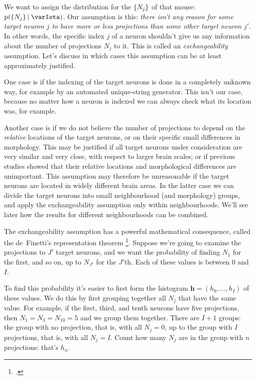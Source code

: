 \documentclass[\ifafour a4paper,12pt,\else a5paper,10pt,\fi%
onecolumn,oneside,article,%
british%
]{memoir}
\theoremstyle{remark}
\theoremstyle{innote}
\newcommand*{\citep}{\footcites}
\newcommand*{\pf}{\mathrm{p}}%
\renewcommand*{\|}[1][]{\nonscript\,#1\vert\nonscript\;\mathopen{}}
\newcommand*{\puzzle}{{\fontencoding{U}\fontfamily{fontawesometwo}\selectfont\symbol{225}}}
\newcommand{\mynote}[1]{ {\color{notecolour}\puzzle\ #1}}
\newcommand*{\yI}{\varIota}
\newcommand*{\yh}{\bm{h}}
\DeclarePairedDelimiter\tu{\{}{\}}
\begin{document}
We want to assign the distribution for the $\tu{N_{j}}$ of that mouse:
$\pf(\tu{N_{j}} \| \yI)$. Our assumption is this: \emph{there isn't any
  reason for some target neuron $j$ to have more or less projections than
  some other target neuron $j'$}. In other words, the specific index $j$ of
a neuron shouldn't give us any information about the number of projections
$N_{j}$ to it. This is called an \emph{exchangeability} assumption. Let's
discuss in which cases this assumption can be at least approximately
justified.

One case is if the indexing of the target neurons is done in a completely
unknown way, for example by an automated unique-string generator. This
isn't our case, because no matter how a neuron is indexed we can always
check what its location was, for example.

Another case is if we do not believe the number of projections to depend on
the \emph{relative} locations of the target neurons, or on their specific
small differences in morphology. This may be justified if all target
neurons under consideration are very similar and very close, with respect
to larger brain scales; or if previous studies showed that their relative
locations and morphological differences are unimportant. This assumption
may therefore be unreasonable if the target neurons are located in widely
different brain areas. In the latter case we can divide the target neurons
into small neighbourhood (and morphology) groups, and apply the
exchangeability assumption only within neighbourhoods. We'll see later how
the results for different neighbourhoods can be combined.

The exchangeability assumption has a powerful mathematical consequence,
called the de~Finetti's representation theorem
\citep[\mynote{add refs for finite case}]{definetti1930,hewittetal1955,heathetal1976,diaconis1977,diaconisetal1980,dawid2013}.
Suppose we're going to examine the projections to $J'$ target neurons, and
we want the probability of finding $N_{1}$ for the first, and so on, up to
$N_{J'}$ for the $J'$th. Each of these values is between $0$ and $I$.

To find this probability it's easier to first form the histogram
$\yh=(h_{0},\dotsc,h_{I})$ of these values. We do this by first grouping
together all $N_{j}$ that have the same value. For example, if the first,
third, and tenth neurons have five projections, then $N_{1}=N_{3}=N_{10}=5$
and we group them together. There are $I+1$ groups: the group with no
projection, that is, with all $N_{j}=0$, up to the group with $I$
projections, that is, with all $N_{j}=I$. Count how many $N_{j}$ are in the
group with $n$ projections: that's $h_{n}$.
\end{document}
